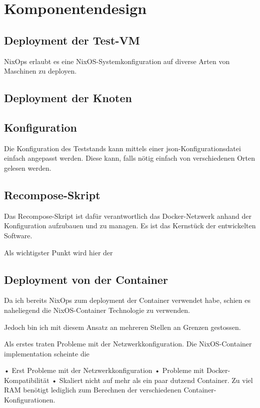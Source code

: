 \section{Komponentendesign}

\subsection{Deployment der Test-VM}

NixOps erlaubt es eine NixOS-Systemkonfiguration auf diverse Arten von Maschinen zu deployen.

\subsection{Deployment der Knoten}


\subsection{Konfiguration}

Die Konfiguration des Teststands kann mittels einer json-Konfigurationsdatei einfach angepasst werden.
Diese kann, falls nötig einfach von verschiedenen Orten gelesen werden.

\subsection{Recompose-Skript}

Das Recompose-Skript ist dafür verantwortlich das Docker-Netzwerk anhand der Konfiguration aufzubauen und zu managen. Es ist das Kernstück der entwickelten Software.

Als wichtigster Punkt wird hier der 

\subsection{Deployment von der Container}

Da ich bereits NixOps zum deployment der Container verwendet habe, schien es naheliegend die NixOS-Container Technologie zu verwenden.

Jedoch bin ich mit diesem Ansatz an mehreren Stellen an Grenzen gestossen.

Als erstes traten Probleme mit der Netzwerkkonfiguration. Die NixOS-Container implementation scheinte die 

• Erst Probleme mit der Netzwerkkonfiguration
• Probleme mit Docker-Kompatibilität
• Skaliert nicht auf mehr als ein paar dutzend Container. Zu viel
RAM benötigt lediglich zum Berechnen der verschiedenen
Container-Konfigurationen.

